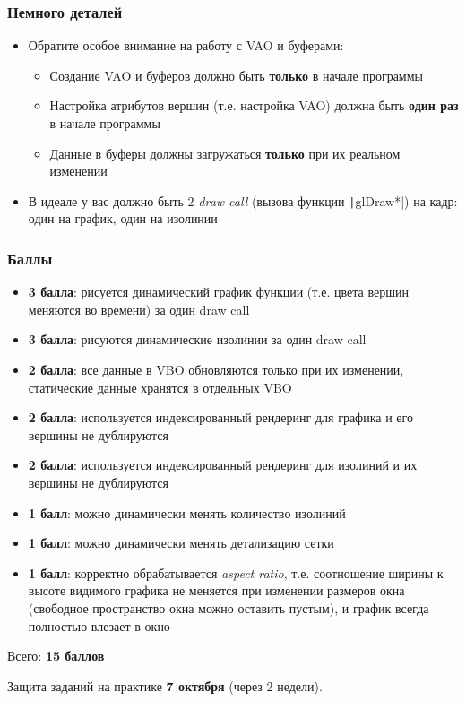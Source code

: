 \documentclass{beamer}
\begin{document}
\begin{frame}[fragile]
\frametitle{Немного деталей}
\begin{itemize}
\item Обратите особое внимание на работу с VAO и буферами:
\begin{itemize}
\item Создание VAO и буферов должно быть \textbf{только} в начале программы
\item Настройка атрибутов вершин (т.е. настройка VAO) должна быть \textbf{один раз} в начале программы
\item Данные в буферы должны загружаться \textbf{только} при их реальном изменении
\end{itemize}
\pause
\item В идеале у вас должно быть 2 \textit{draw call} (вызова функции \texttt|glDraw*|) на кадр: один на график, один на изолинии
\end{itemize}
\end{frame}

\begin{frame}[fragile]
\frametitle{Баллы}
\scriptsize
\begin{itemize}
\item \textbf{3 балла}: рисуется динамический график функции (т.е. цвета вершин меняются во времени) за один draw call
\item \textbf{3 балла}: рисуются динамические изолинии за один draw call
\item \textbf{2 балла}: все данные в VBO обновляются только при их изменении, статические данные хранятся в отдельных VBO
\item \textbf{2 балла}: используется индексированный рендеринг для графика и его вершины не дублируются
\item \textbf{2 балла}: используется индексированный рендеринг для изолиний и их вершины не дублируются
\item \textbf{1 балл}:  можно динамически менять количество изолиний
\item \textbf{1 балл}:  можно динамически менять детализацию сетки
\item \textbf{1 балл}:  корректно обрабатывается \textit{aspect ratio}, т.е. соотношение ширины к высоте видимого графика не меняется при изменении размеров окна (свободное пространство окна можно оставить пустым), и график всегда полностью влезает в окно
\end{itemize}
Всего: \textbf{15 баллов}

Защита заданий на практике \textbf{7 октября} (через 2 недели).
\end{frame}
\end{document}
